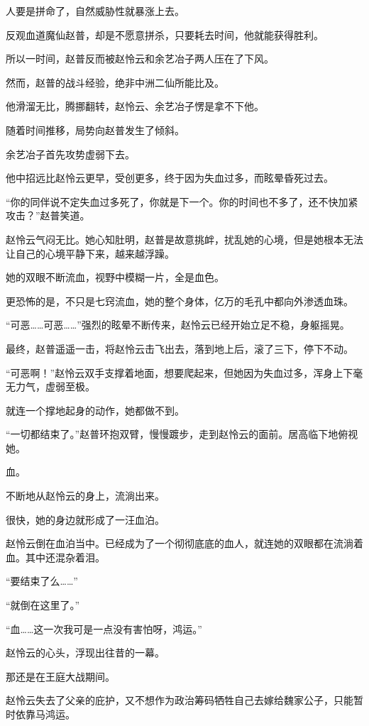 
\begin{this_body}

人要是拼命了，自然威胁性就暴涨上去。

反观血道魔仙赵普，却是不愿意拼杀，只要耗去时间，他就能获得胜利。

所以一时间，赵普反而被赵怜云和余艺冶子两人压在了下风。

然而，赵普的战斗经验，绝非中洲二仙所能比及。

他滑溜无比，腾挪翻转，赵怜云、余艺冶子愣是拿不下他。

随着时间推移，局势向赵普发生了倾斜。

余艺冶子首先攻势虚弱下去。

他中招远比赵怜云更早，受创更多，终于因为失血过多，而眩晕昏死过去。

“你的同伴说不定失血过多死了，你就是下一个。你的时间也不多了，还不快加紧攻击？”赵普笑道。

赵怜云气闷无比。她心知肚明，赵普是故意挑衅，扰乱她的心境，但是她根本无法让自己的心境平静下来，越来越浮躁。

她的双眼不断流血，视野中模糊一片，全是血色。

更恐怖的是，不只是七窍流血，她的整个身体，亿万的毛孔中都向外渗透血珠。

“可恶……可恶……”强烈的眩晕不断传来，赵怜云已经开始立足不稳，身躯摇晃。

最终，赵普遥遥一击，将赵怜云击飞出去，落到地上后，滚了三下，停下不动。

“可恶啊！”赵怜云双手支撑着地面，想要爬起来，但她因为失血过多，浑身上下毫无力气，虚弱至极。

就连一个撑地起身的动作，她都做不到。

“一切都结束了。”赵普环抱双臂，慢慢踱步，走到赵怜云的面前。居高临下地俯视她。

血。

不断地从赵怜云的身上，流淌出来。

很快，她的身边就形成了一汪血泊。

赵怜云倒在血泊当中。已经成为了一个彻彻底底的血人，就连她的双眼都在流淌着血。其中还混杂着泪。

“要结束了么……”

“就倒在这里了。”

“血……这一次我可是一点没有害怕呀，鸿运。”

赵怜云的心头，浮现出往昔的一幕。

那还是在王庭大战期间。

赵怜云失去了父亲的庇护，又不想作为政治筹码牺牲自己去嫁给魏家公子，只能暂时依靠马鸿运。


\end{this_body}
